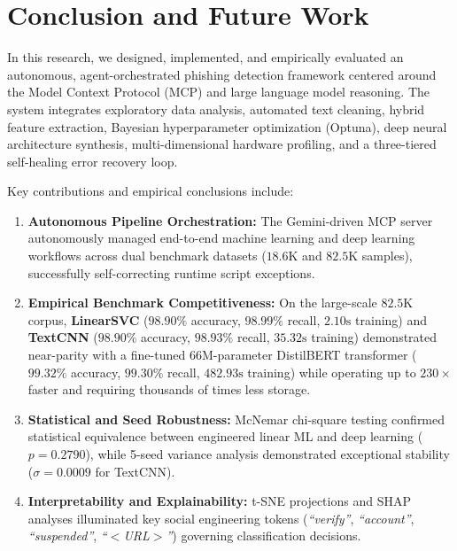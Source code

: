 \documentclass[conference]{IEEEtran}
\begin{document}
\FloatBarrier

\section{Conclusion and Future Work}
\label{sec:conclusion}

In this research, we designed, implemented, and empirically evaluated an autonomous, agent-orchestrated phishing detection framework centered around the Model Context Protocol (MCP) and large language model reasoning. The system integrates exploratory data analysis, automated text cleaning, hybrid feature extraction, Bayesian hyperparameter optimization (Optuna), deep neural architecture synthesis, multi-dimensional hardware profiling, and a three-tiered self-healing error recovery loop.

Key contributions and empirical conclusions include:
\begin{enumerate}
    \item \textbf{Autonomous Pipeline Orchestration:} The Gemini-driven MCP server autonomously managed end-to-end machine learning and deep learning workflows across dual benchmark datasets ($18.6\text{K}$ and $82.5\text{K}$ samples), successfully self-correcting runtime script exceptions.
    \item \textbf{Empirical Benchmark Competitiveness:} On the large-scale $82.5\text{K}$ corpus, \textbf{LinearSVC} ($98.90\%$ accuracy, $98.99\%$ recall, $2.10\text{s}$ training) and \textbf{TextCNN} ($98.90\%$ accuracy, $98.93\%$ recall, $35.32\text{s}$ training) demonstrated near-parity with a fine-tuned $66\text{M}$-parameter DistilBERT transformer ($99.32\%$ accuracy, $99.30\%$ recall, $482.93\text{s}$ training) while operating up to $230\times$ faster and requiring thousands of times less storage.
    \item \textbf{Statistical and Seed Robustness:} McNemar chi-square testing confirmed statistical equivalence between engineered linear ML and deep learning ($p = 0.2790$), while 5-seed variance analysis demonstrated exceptional stability ($\sigma = 0.0009$ for TextCNN).
    \item \textbf{Interpretability and Explainability:} t-SNE projections and SHAP analyses illuminated key social engineering tokens (\textit{``verify''}, \textit{``account''}, \textit{``suspended''}, \textit{``$<$URL$>$''}) governing classification decisions.
\end{enumerate}
\end{document}
